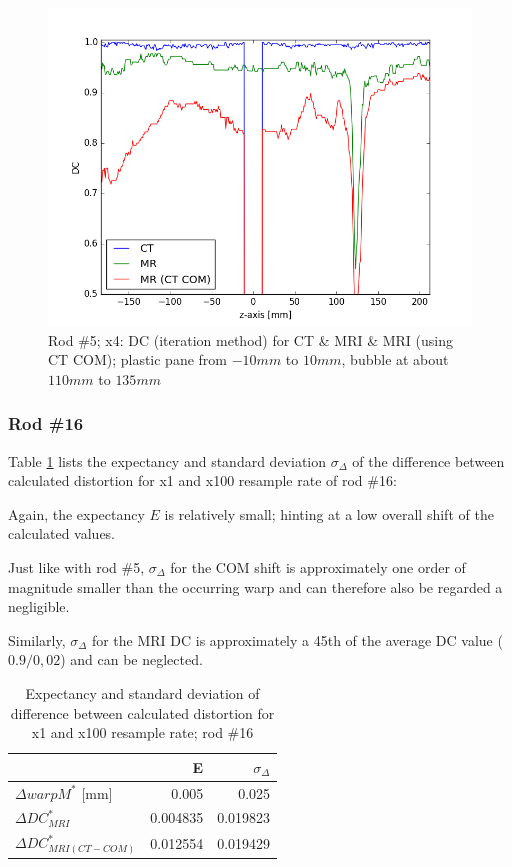 \begin{figure}[!bth]
    \centering
    \includegraphics[scale=0.6]{../fig/python/ph2/dice/ph2_DC_x4_iter.png}
    \caption{Rod \#5; x4: DC (iteration method) for CT \& MRI \& MRI (using CT COM); plastic pane from $-10mm$ to $10mm$, bubble at about $110mm$ to $135mm$}
    \label{fig:ph2_DC_x4}
\end{figure}

\clearpage

\subsubsection{Rod \#16}

Table \ref{tab:Delta-resample_16} lists the expectancy and standard deviation $\sigma_\Delta$ of the difference between calculated distortion for x1 and x100 resample rate of rod \#16:

Again, the expectancy $E$ is relatively small; hinting at a low overall shift of the calculated values.

Just like with rod \#5, $\sigma_\Delta$ for the COM shift is approximately one order of magnitude smaller than the occurring warp and can therefore also be regarded a negligible.

Similarly, $\sigma_\Delta$ for the MRI DC is approximately a 45th of the average DC value ($0.9/0,02$) and can be neglected.

\begin{table}[!tbh]
\centering
\begin{tabular}{l|rr}
                    & E         & $\sigma_\Delta$   \\ \hline
$\Delta warpM^*$ [mm]  & 0.005     & 0.025    \\
$\Delta DC^*_{MRI}$         & 0.004835   & 0.019823  \\
$\Delta DC^*_{MRI(CT-COM)}$ & 0.012554   & 0.019429
\end{tabular}
\caption{Expectancy and standard deviation of difference between calculated distortion for x1 and x100 resample rate; rod \#16}
\label{tab:Delta-resample_16}
\end{table}

